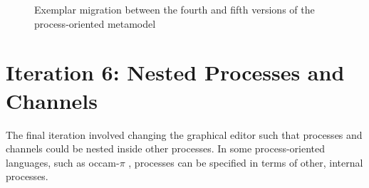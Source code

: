 \begin{figure}[htbp]
	\centering
	\caption{Exemplar migration between the fourth and fifth versions of the process-oriented metamodel}
\end{figure}

\clearpage


\section{Iteration 6: Nested Processes and Channels}
The final iteration involved changing the graphical editor such that processes and channels could be nested inside other processes. In some process-oriented languages, such as occam-$\pi$ \cite{occam_pi}, processes can be specified in terms of other, internal processes.

